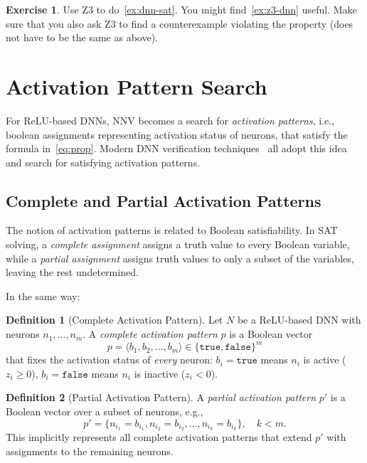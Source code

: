 \documentclass[oneside,11pt,dvipsnames]{book}
\numberwithin{equation}{section}
\theoremstyle{definition}
\newtheorem{definition}{Definition}[section]
\newtheorem{exercise}{Exercise}[section]
\theoremstyle{remark}
\begin{document}
\begin{exercise}
Use Z3 to do~\autoref{ex:dnn-sat}. You might find~\autoref{ex:z3-dnn} useful.  Make sure that you also ask Z3 to  find a counterexample violating the property (does not have to be the same as above).
\end{exercise}

\section{Activation Pattern Search}\label{sec:activation-pattern}
 For ReLU-based DNNs, NNV becomes a search for \emph{activation patterns}, i.e., boolean assignments representing activation status of neurons, that satisfy the formula in~\autoref{eq:prop}. 
 Modern DNN verification techniques~\cite{bunel2020branch,wang2021beta,ferrari2022complete,duong2024harnessing,duong2023dpllt,ovalbab,katz2019marabou,bak2021nnenum} all adopt this idea and search for satisfying activation patterns.



 \subsection{Complete and Partial Activation Patterns}\label{sec:activation-patterns}

The notion of activation patterns is related to Boolean satisfiability.
In SAT solving, a \emph{complete assignment} assigns a truth value to every Boolean variable, while a \emph{partial assignment} assigns truth values to only a subset of the variables, leaving the rest undetermined.

In the same way:

\begin{definition}[Complete Activation Pattern]
Let $N$ be a ReLU-based DNN with neurons $n_1,\dots,n_m$.
A \emph{complete activation pattern} $p$ is a Boolean vector
\[
p = \langle b_1, b_2, \dots, b_m \rangle \in \{\texttt{true}, \texttt{false}\}^m
\]
that fixes the activation status of \emph{every} neuron:
$b_i = \texttt{true}$ means $n_i$ is active ($z_i \ge 0$),
$b_i = \texttt{false}$ means $n_i$ is inactive ($z_i < 0$).
\end{definition}

\begin{definition}[Partial Activation Pattern]
A \emph{partial activation pattern} $p'$ is a Boolean vector over a subset of neurons, e.g.,
\[
p' = \{n_{i_1} = b_{i_1}, n_{i_2} = b_{i_2}, \dots, n_{i_k} = b_{i_k}\},
\quad k < m.
\]
This implicitly represents all complete activation patterns that extend $p'$ with assignments to the remaining neurons.
\end{definition}
\end{document}

